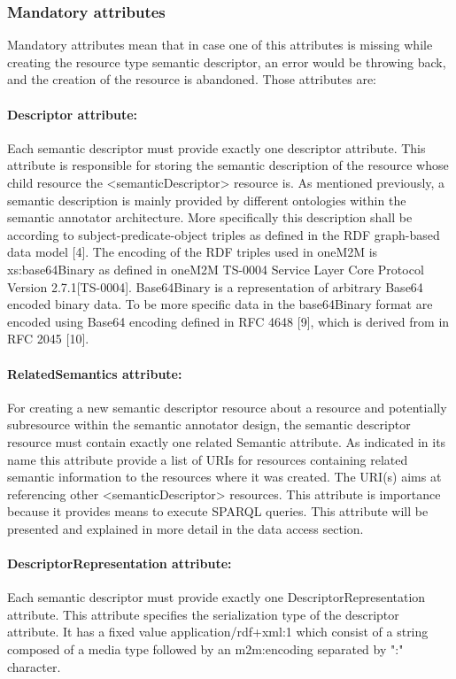 \subsubsection{Mandatory attributes}
Mandatory attributes mean that in case one of this attributes is missing while creating the resource type semantic descriptor, an error would be throwing back, and the creation of the resource is abandoned.
Those attributes are: 

\paragraph*{Descriptor attribute:}

Each semantic descriptor must provide exactly one descriptor attribute. This attribute is responsible for storing the semantic description of the resource whose child resource the <semanticDescriptor> resource is. As mentioned previously, a semantic description is mainly provided by different ontologies within the semantic annotator architecture. More specifically this description shall be according to subject-predicate-object triples as defined in the RDF graph-based data model [4]. The encoding of the RDF triples used in oneM2M is xs:base64Binary as defined in oneM2M TS-0004 Service Layer Core Protocol Version 2.7.1[TS-0004]. Base64Binary is a representation of arbitrary Base64 encoded binary data. To be more specific data in the base64Binary format are encoded using Base64 encoding defined in RFC 4648 [9], which is derived from in RFC 2045 [10].
\paragraph*{RelatedSemantics attribute:}

For creating a new semantic descriptor resource about a resource and potentially subresource within the semantic annotator design, the semantic descriptor resource must contain exactly one related Semantic attribute. As indicated in its name this attribute provide a list of URIs for resources containing related semantic information to the resources where it was created. The URI(s) aims at referencing other <semanticDescriptor> resources. This attribute is importance because it provides means to execute SPARQL queries. This attribute will be presented and explained in more detail in the data access section.
\paragraph*{DescriptorRepresentation attribute:}
Each semantic descriptor must provide exactly one DescriptorRepresentation attribute. This attribute specifies the serialization type of the descriptor attribute. It has a fixed value application/rdf+xml:1 which consist of a string composed of a media type followed by an m2m:encoding separated by ":" character. 
